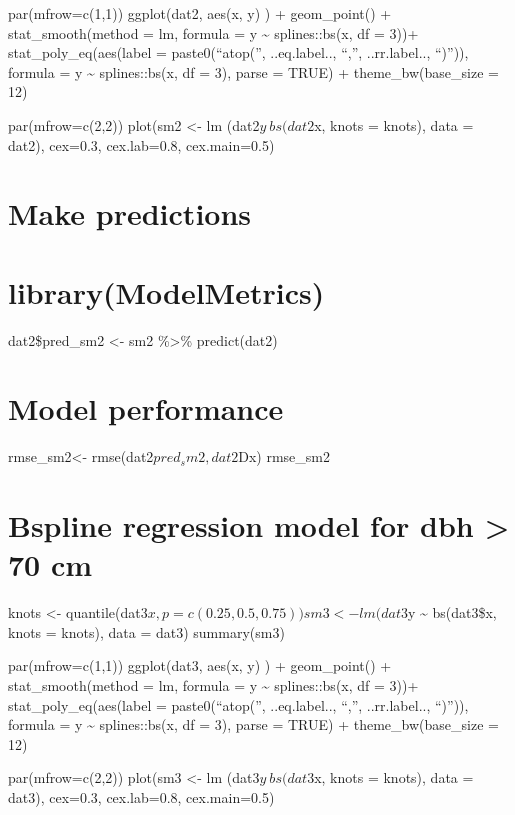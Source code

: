 \documentclass[
]{article}
\begin{document}
par(mfrow=c(1,1)) ggplot(dat2, aes(x, y) ) + geom\_point() +
stat\_smooth(method = lm, formula = y \textasciitilde{} splines::bs(x,
df = 3))+ stat\_poly\_eq(aes(label = paste0(``atop('', ..eq.label..,
``,'', ..rr.label.., ``)'')), formula = y \textasciitilde{}
splines::bs(x, df = 3), parse = TRUE) + theme\_bw(base\_size = 12)

par(mfrow=c(2,2)) plot(sm2 \textless- lm (dat2\(y ~ bs(dat2\)x, knots =
knots), data = dat2), cex=0.3, cex.lab=0.8, cex.main=0.5)

\hypertarget{make-predictions-7}{%
\section{Make predictions}\label{make-predictions-7}}

\hypertarget{librarymodelmetrics-7}{%
\section{library(ModelMetrics)}\label{librarymodelmetrics-7}}

dat2\$pred\_sm2 \textless- sm2 \%\textgreater\% predict(dat2)

\hypertarget{model-performance-1}{%
\section{Model performance}\label{model-performance-1}}

rmse\_sm2\textless- rmse(dat2\(pred_sm2, dat2\)Dx) rmse\_sm2

\hypertarget{bspline-regression-model-for-dbh-70-cm}{%
\section{Bspline regression model for dbh \textgreater{} 70
cm}\label{bspline-regression-model-for-dbh-70-cm}}

knots \textless-
quantile(dat3\(x, p = c(0.25, 0.5, 0.75)) sm3 <- lm (dat3\)y
\textasciitilde{} bs(dat3\$x, knots = knots), data = dat3) summary(sm3)

par(mfrow=c(1,1)) ggplot(dat3, aes(x, y) ) + geom\_point() +
stat\_smooth(method = lm, formula = y \textasciitilde{} splines::bs(x,
df = 3))+ stat\_poly\_eq(aes(label = paste0(``atop('', ..eq.label..,
``,'', ..rr.label.., ``)'')), formula = y \textasciitilde{}
splines::bs(x, df = 3), parse = TRUE) + theme\_bw(base\_size = 12)

par(mfrow=c(2,2)) plot(sm3 \textless- lm (dat3\(y ~ bs(dat3\)x, knots =
knots), data = dat3), cex=0.3, cex.lab=0.8, cex.main=0.5)
\end{document}
